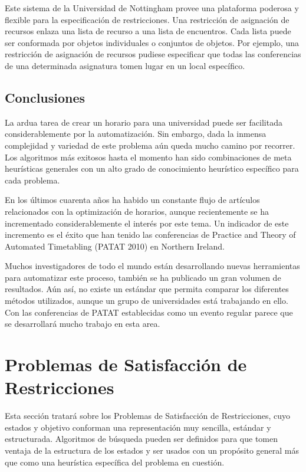 Este sistema de la Universidad de Nottingham provee una plataforma poderosa y flexible para la especificación de restricciones. Una restricción de asignación de recursos enlaza una lista de recurso a una lista de encuentros. Cada lista puede ser conformada por objetos individuales o conjuntos de objetos. Por ejemplo, una restricción de asignación de recursos pudiese especificar que todas las conferencias de una determinada asignatura tomen lugar en un local específico.

\subsection{Conclusiones}

La ardua tarea de crear un horario para una universidad puede ser facilitada considerablemente por la automatización. Sin embargo, dada la inmensa complejidad y variedad de este problema aún queda mucho camino por recorrer. Los algoritmos más exitosos hasta el momento han sido combinaciones de meta heurísticas generales con un alto grado de conocimiento heurístico específico para cada problema.

En los últimos cuarenta años ha habido un constante flujo de artículos relacionados con la optimización de horarios, aunque recientemente se ha incrementado considerablemente el inter\'es por este tema. Un indicador de este incremento es el \'exito que han tenido las conferencias de Practice and Theory of Automated Timetabling (PATAT 2010) en Northern Ireland.

Muchos investigadores de todo el mundo están desarrollando nuevas herramientas para automatizar este proceso, tambi\'en se ha publicado un gran volumen de resultados. Aún así, no existe un estándar que permita comparar los diferentes m\'etodos utilizados, aunque un grupo de universidades está trabajando en ello. Con las conferencias de PATAT establecidas como un evento regular parece que se desarrollará mucho trabajo en esta area.

\section{Problemas de Satisfacción de Restricciones}

Esta sección tratará sobre los Problemas de Satisfacción de Restricciones, cuyo estados y objetivo conforman una representación muy sencilla, estándar y estructurada. Algoritmos de búsqueda pueden ser definidos para que tomen ventaja de la estructura de los estados y ser usados con un propósito general más que como una heurística específica del problema en cuestión.

